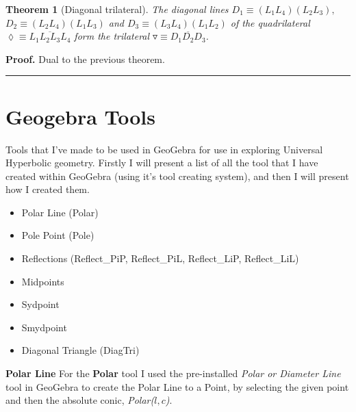 \documentclass{unswthesis}
\newtheorem{theorem}{Theorem}
\newenvironment{proof}[1][Proof]{\noindent\textbf{#1.} }{\ \rule{0.5em}{0.5em}}
\begin{document}
\begin{theorem}[Diagonal trilateral]
The diagonal lines $D_{1}\equiv(L_{1}L_{4})(L_{2}L_{3}),$\newline
$D_{2}\equiv(L_{2}L_{4})(L_{1}L_{3})$ and $D_{3}%
\equiv(L_{3}L_{4})(L_{1}L_{2})$ of the quadrilateral $\lozenge\equiv%
\overline{L_{1}L_{2}L_{3}L_{4}}$ form the trilateral $\triangledown\equiv%
\overline{D_{1}D_{2}D_{3}}$.
\end{theorem}

\begin{proof}
Dual to the previous theorem.
\end{proof}

\pagebreak

\section{\protect\bigskip Geogebra Tools}

Tools that I've made to be used in GeoGebra for use in exploring Universal
Hyperbolic geometry. Firstly I will present a list of all the tool that I
have created within GeoGebra (using it's tool creating system), and then I
will present how I created them.\newline

\begin{itemize}
\item Polar Line (Polar)

\item Pole Point (Pole)

\item Reflections (Reflect\_PiP, Reflect\_PiL, Reflect\_LiP, Reflect\_LiL)

\item Midpoints

\item Sydpoint

\item Smydpoint

\item Diagonal Triangle (DiagTri)
\end{itemize}

\textbf{Polar Line}\newline
For the \textbf{Polar} tool I used the pre-installed \textit{Polar or
Diameter Line} tool in GeoGebra to create the Polar Line to a Point, by
selecting the given point and then the absolute conic, \textit{Polar($l,c$)}.%
\newline
\end{document}
